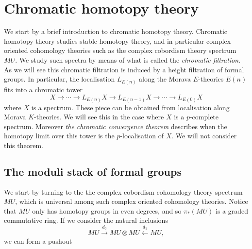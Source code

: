 \documentclass[a4paper]{article} %
\theoremstyle{definition}
\newcommand{\toWithMapLong}[1]{\overset{#1}{\longrightarrow}}
\begin{document}
\section{Chromatic homotopy theory}\label{Section:chromhtpytheory}

We start by a brief introduction to chromatic homotopy theory. Chromatic homotopy theory studies stable homotopy theory, and in particular complex oriented cohomology theories such as the complex cobordism theory spectrum $MU$. We study such spectra by means of what is called the \textit{chromatic filtration}. As we will see this chromatic filtration is induced by a height filtration of formal groups. In particular, the localisation $L_{E(n)}$ along the Morava $E$-theories $E(n)$ fits into a chromatic tower
\[
X \toWithMapLong{} \cdots \toWithMapLong{} L_{E(n)}X \toWithMapLong{} L_{E(n-1)}X \toWithMapLong{} \cdots \toWithMapLong{} L_{E(0)}X
\]
where $X$ is a spectrum. These piece can be obtained from localisation along Morava $K$-theories. We will see this in the case where $X$ is a $p$-complete spectrum. Moreover \textit{the chromatic convergence theorem} describes when the homotopy limit over this tower is the $p$-localisation of $X$. We will not consider this theorem.

\subsection{The moduli stack of formal groups}

We start by turning to the the complex cobordism cohomology theory spectrum $MU$, which is universal among such complex oriented cohomology theories. Notice that $MU$ only has homotopy groups in even degrees, and so $\pi_*(MU)$ is a graded commutative ring. If we consider the natural inclusions $$MU \overset{d_0}{\to} MU \otimes MU \overset{d_1}{\leftarrow} MU,$$ we can form a pushout
\end{document}
